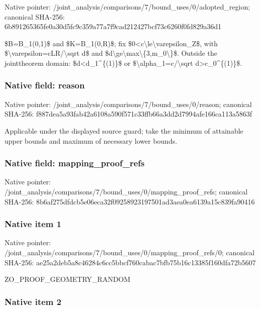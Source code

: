 \documentclass[10pt,a4paper]{article}
\begin{document}
Native pointer: /joint\_analysis/comparis\allowbreak{}ons/7/bound\_uses/0/adopt\allowbreak{}ed\_region; canonical SHA-256: 6b891265365fe0a30d5fc9c3\allowbreak{}59a77a7f9cad212427bcf73c\allowbreak{}6260f0fd829a36d1


\$B=B\_1(0,1)\$ and \$K=B\_1(0,R)\$; fix \$0<c\textbackslash{}le\textbackslash{}varepsilon\_Z\$, with \$\textbackslash{}varepsilon=cLR/\textbackslash{}sqrt d\$ and \$d\textbackslash{}ge\textbackslash{}max\textbackslash{}\{3,m\_0\textbackslash{}\}\$. Outside the jointtheorem domain: \$d<d\_1\textasciicircum{}\{(1)\}\$ or \$\textbackslash{}alpha\_1=c/\textbackslash{}sqrt d>c\_0\textasciicircum{}\{(1)\}\$.


\subsubsection{Native field: reason}


Native pointer: /joint\_analysis/comparis\allowbreak{}ons/7/bound\_uses/0/reaso\allowbreak{}n; canonical SHA-256: f887dea5a93fab42a6108a59\allowbreak{}0f571c33ffb66a3dd2d7994a\allowbreak{}fe166ca113a5863f


Applicable under the displayed source guard; take the minimum of attainable upper bounds and maximum of necessary lower bounds.


\subsubsection{Native field: mapping\_proof\_refs}


Native pointer: /joint\_analysis/comparis\allowbreak{}ons/7/bound\_uses/0/mappi\allowbreak{}ng\_proof\_refs; canonical SHA-256: 8b6af275dfdcb5e06eca32f0\allowbreak{}9258923197501ad3aea0ea61\allowbreak{}39a15c839fa90416



\subsubsection{Native item 1}


Native pointer: /joint\_analysis/comparis\allowbreak{}ons/7/bound\_uses/0/mappi\allowbreak{}ng\_proof\_refs/0; canonical SHA-256: ae25a2deb5a8c46284c6cc5b\allowbreak{}bcf760cabac7bfb75b16c133\allowbreak{}85f160dfa72b5607


ZO\_PROOF\_GEOMETRY\_RANDOM


\subsubsection{Native item 2}
\end{document}
